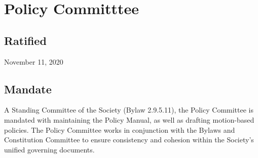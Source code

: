 \section{Policy Committtee}

\subsection{Ratified}
November 11, 2020

\subsection{Mandate}
A Standing Committee of the Society (Bylaw 2.9.5.11), the Policy Committee is mandated with maintaining the Policy Manual, as well as drafting motion-based policies. The Policy Committee works in conjunction with the Bylaws and Constitution Committee to ensure consistency and cohesion within the Society’s unified governing documents.

